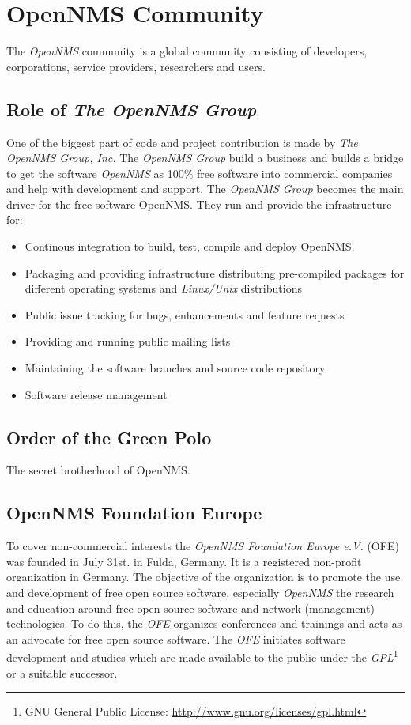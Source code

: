 \section{OpenNMS Community}
The \emph{OpenNMS} community is a global community consisting of developers, corporations, service providers, researchers and users.

\subsection*{Role of \emph{The OpenNMS Group}}
One of the biggest part of code and project contribution is made by \emph{The OpenNMS Group, Inc.} The \emph{OpenNMS Group} build a business and builds a bridge to get the software \emph{OpenNMS} as 100\% free software into commercial companies and help with development and support. The \emph{OpenNMS Group} becomes the main driver for the free software OpenNMS. They run and provide the infrastructure for:
\begin{itemize}
  \item Continous integration to build, test, compile and deploy OpenNMS.
  \item Packaging and providing infrastructure distributing pre-compiled packages for different operating systems and \emph{Linux/Unix} distributions
  \item Public issue tracking for bugs, enhancements and feature requests
  \item Providing and running public mailing lists
  \item Maintaining the software branches and source code repository
  \item Software release management
\end{itemize}

\subsection*{Order of the Green Polo}
The secret brotherhood of OpenNMS.

\subsection*{OpenNMS Foundation Europe}
To cover non-commercial interests the \emph{OpenNMS Foundation Europe e.V.} (OFE) was founded in July 31st. in Fulda, Germany. It is a registered non-profit organization in Germany. The objective of the organization is to promote the use and development of free open source software, especially \emph{OpenNMS} the research and education around free open source software and network (management) technologies. To do this, the \emph{OFE} organizes conferences and trainings and acts as an advocate for free open source software. The \emph{OFE} initiates software development and studies which are made available to the public under the \emph{GPL}\footnote{GNU General Public License: \url{http://www.gnu.org/licenses/gpl.html}} or a suitable successor.

